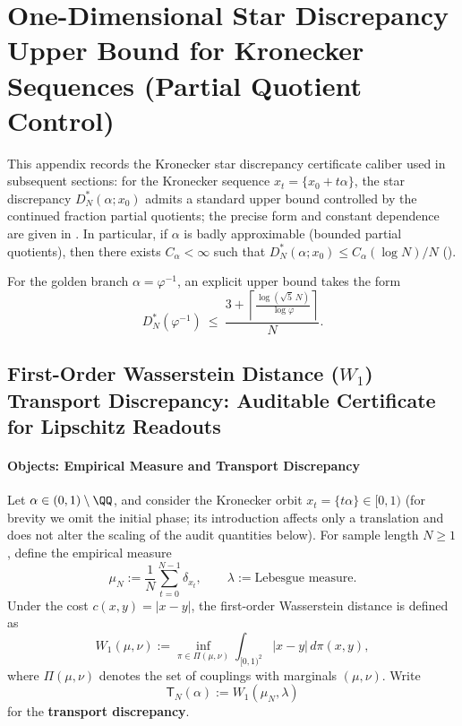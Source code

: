 \section{One-Dimensional Star Discrepancy Upper Bound for Kronecker Sequences (Partial Quotient Control)}\label{app:kronecker-discrepancy}

This appendix records the Kronecker star discrepancy certificate caliber used in subsequent sections: for the Kronecker sequence \(x_t=\{x_0+t\alpha\}\), the star discrepancy \(D_N^\ast(\alpha;x_0)\) admits a standard upper bound controlled by the continued fraction partial quotients; the precise form and constant dependence are given in \cite{KuipersNiederreiter1974,Goda2024QuasiUniformKronecker}. In particular, if \(\alpha\) is badly approximable (bounded partial quotients), then there exists \(C_\alpha<\infty\) such that \(D_N^\ast(\alpha;x_0)\le C_\alpha(\log N)/N\) (\cite{KuipersNiederreiter1974}).
\par
For the golden branch \(\alpha=\varphi^{-1}\), an explicit upper bound takes the form
\[
D_N^*(\varphi^{-1})\ \le\ \frac{3+\left\lceil \frac{\log(\sqrt5\,N)}{\log \varphi}\right\rceil}{N}.
\]

\subsection{First-Order Wasserstein Distance (\texorpdfstring{$W_1$}{W1}) Transport Discrepancy: Auditable Certificate for Lipschitz Readouts}\label{app:kronecker-w1-transport}

\paragraph{Objects: Empirical Measure and Transport Discrepancy}
Let \(\alpha\in(0,1)\setminus\QQ\), and consider the Kronecker orbit \(x_t=\{t\alpha\}\in[0,1)\) (for brevity we omit the initial phase; its introduction affects only a translation and does not alter the scaling of the audit quantities below).
For sample length \(N\ge 1\), define the empirical measure
\[
\mu_N:=\frac1N\sum_{t=0}^{N-1}\delta_{x_t},
\qquad
\lambda:=\text{Lebesgue measure}.
\]
Under the cost \(c(x,y)=|x-y|\), the first-order Wasserstein distance is defined as
\[
W_1(\mu,\nu):=\inf_{\pi\in\Pi(\mu,\nu)}\int_{[0,1)^2}|x-y|\,d\pi(x,y),
\]
where \(\Pi(\mu,\nu)\) denotes the set of couplings with marginals \((\mu,\nu)\).
Write
\[
\mathsf{T}_N(\alpha):=W_1(\mu_N,\lambda)
\]
for the \textbf{transport discrepancy}.

